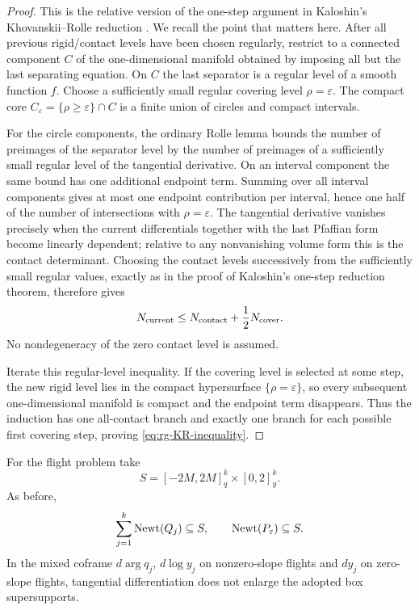 \begin{proof}
This is the relative version of the one-step argument in Kaloshin's
Khovanskii--Rolle reduction \cite[Theorems~16--18]{Kaloshin2003}.  We recall the point that matters here.  After all
previous rigid/contact levels have been chosen regularly, restrict to a
connected component $C$ of the one-dimensional manifold obtained by imposing
all but the last separating equation.  On $C$ the last separator is a regular
level of a smooth function $f$.  Choose a sufficiently small regular covering
level $\rho=\varepsilon$.  The compact core
$C_\varepsilon=\{\rho\ge\varepsilon\}\cap C$ is a finite union of circles and
compact intervals.

For the circle components, the ordinary Rolle lemma bounds the number of
preimages of the separator level by the number of preimages of a sufficiently
small regular level of the tangential derivative.  On an interval component the
same bound has one additional endpoint term.  Summing over all interval
components gives at most one endpoint contribution per interval, hence one half
of the number of intersections with $\rho=\varepsilon$.  The tangential
derivative vanishes precisely when the current differentials together with the
last Pfaffian form become linearly dependent; relative to any nonvanishing
volume form this is the contact determinant.  Choosing the contact levels
successively from the sufficiently small regular values, exactly as in the
proof of Kaloshin's one-step reduction theorem, therefore gives
\[
 N_{\rm current}\le
 N_{\rm contact}+\frac12N_{\rm cover}.
\]
No nondegeneracy of the zero contact level is assumed.

Iterate this regular-level inequality.  If the covering level is selected at
some step, the new rigid level lies in the compact hypersurface
$\{\rho=\varepsilon\}$, so every subsequent one-dimensional manifold is
compact and the endpoint term disappears.  Thus the induction has one
all-contact branch and exactly one branch for each possible first covering
step, proving \eqref{eq:rg-KR-inequality}.
\end{proof}

For the flight problem take
\begin{equation}\label{eq:rg-S}
 S=[-2M,2M]^k_q\times[0,2]^k_y.
\end{equation}
As before,
\begin{equation}\label{eq:rg-support-base}
 \sum_{j=1}^k\operatorname{Newt}(Q_j)\subseteq S,
 \qquad
 \operatorname{Newt}(P_\varepsilon)\subseteq S.
\end{equation}
In the mixed coframe $d\arg q_j$, $d\log y_j$ on nonzero-slope flights and
$dy_j$ on zero-slope flights, tangential differentiation does not enlarge the
adopted box supersupports.

